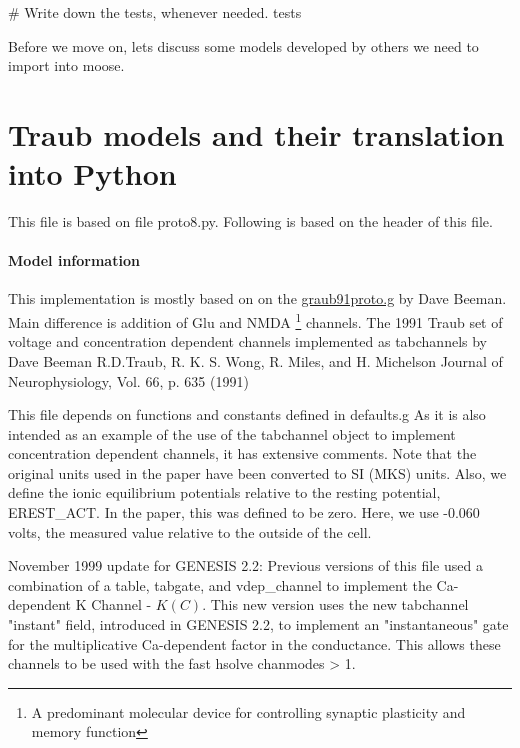 \documentclass[]{article}%
\begin{document}
  # Write down the tests, whenever needed.
  \LA{}tests~{\nwtagstyle{}}\RA{}



\eatline
{}\nwendcode{}\nwdocspar
Before we move on, lets discuss some models developed by others we need to
import into moose.

\section{Traub models and their translation into Python}
\label{subsec:traub}

This file is based on file {\Tt{}proto8.py\nwendquote}. Following is based on the header of
this file.

\paragraph{Model information}

 This implementation is mostly based on on the
 \href{thttp://www.genesis-sim.org/GENESIS/Tutorials/cells/traubcell/traub91proto.g}{graub91proto.g}
 by Dave Beeman. Main difference is addition of Glu and NMDA \footnote{A
 predominant molecular device for controlling synaptic plasticity and memory
 function} channels. The 1991 Traub set of voltage and concentration dependent
 channels implemented as tabchannels by Dave Beeman R.D.Traub, R. K.  S. Wong,
 R. Miles, and H.  Michelson Journal of Neurophysiology, Vol. 66, p. 635 (1991)

 This file depends on functions and constants defined in defaults.g
 As it is also intended as an example of the use of the tabchannel
 object to implement concentration dependent channels, it has extensive
 comments.  Note that the original units used in the paper have been
 converted to SI (MKS) units.  Also, we define the ionic equilibrium 
 potentials relative to the resting potential, {\Tt{}EREST{\_}ACT\nwendquote}.  In the
 paper, this was defined to be zero.  Here, we use -0.060 volts, the
 measured value relative to the outside of the cell.

 November 1999 update for GENESIS 2.2: Previous versions of this file used
 a combination of a table, {\Tt{}tabgate\nwendquote}, and {\Tt{}vdep{\nwbackslash}{\_}channel\nwendquote} to implement the
 Ca-dependent K Channel - $K(C)$.  This new version uses the new tabchannel
 "instant" field, introduced in GENESIS 2.2, to implement an
 "instantaneous" gate for the multiplicative Ca-dependent factor in the
 conductance.   This allows these channels to be used with the fast
 {\Tt{}hsolve\nwendquote}  chanmodes > 1.
\end{document}
